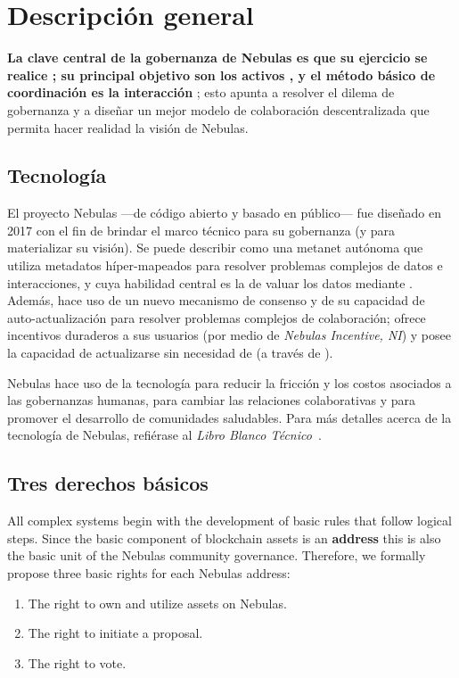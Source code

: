 \section{Descripción general}

\textbf{La clave central de la gobernanza de Nebulas es que su ejercicio se realice \onchain; su principal objetivo son los activos \onchain, y el método básico de coordinación es la interacción \onchain}; esto apunta a resolver el dilema de gobernanza y a diseñar un mejor modelo de colaboración descentralizada que permita hacer realidad la visión de Nebulas.

\subsection{Tecnología}

El proyecto Nebulas —de código abierto y basado en \blockchain público— fue diseñado en 2017 con el fin de brindar el marco técnico para su gobernanza (y para materializar su visión). Se puede describir como una metanet autónoma que utiliza metadatos híper-mapeados para resolver problemas complejos de datos e interacciones, y cuya habilidad central es la de valuar los datos \onchain mediante \nr. Además, hace uso de un nuevo mecanismo de consenso y de su capacidad de auto-actualización para resolver problemas complejos de colaboración; ofrece incentivos duraderos a sus usuarios (por medio de \textit{Nebulas Incentive, NI}) y posee la capacidad de actualizarse sin necesidad de \forks (a través de \nforce).

Nebulas hace uso de la tecnología para reducir la fricción y los costos asociados a las gobernanzas humanas, para cambiar las relaciones colaborativas y para promover el desarrollo de comunidades saludables. Para más detalles acerca de la tecnología de Nebulas, refiérase al \textit{Libro Blanco Técnico}~\cite{TechWhitepaper}.

\subsection{Tres derechos básicos}
\label{rights}

All complex systems begin with the development of basic rules that follow logical steps. Since the basic component of blockchain assets is an \textbf{address} this is also the basic unit of the Nebulas community governance. Therefore, we formally propose three basic rights for each Nebulas address:

\begin{enumerate}
	\item The right to own and utilize assets on Nebulas.
	\item The right to initiate a proposal.
	\item The right to vote.
\end{enumerate}

